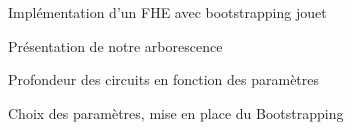 \begin{section}{Implémentation d'un FHE avec bootstrapping \og{} jouet\fg{}}
	\begin{subsection}{Présentation de notre arborescence}
	\end{subsection}
	\begin{subsection}{Profondeur des circuits en fonction des paramètres}
	\end{subsection}
	\begin{subsection}{Choix des paramètres, mise en place du Bootstrapping}
	\end{subsection}
\end{section}
